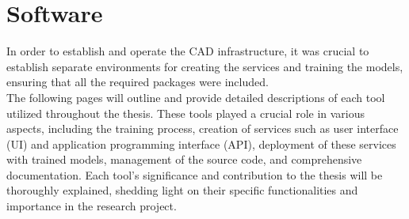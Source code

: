\section{Software}

In order to establish and operate the CAD infrastructure, it was crucial to
establish separate environments for creating the services and training the
models, ensuring that all the required packages were included. \\

The following pages will outline and provide detailed descriptions of each tool
utilized throughout the thesis. These tools played a crucial role in various
aspects, including the training process, creation of services such as user
interface (UI) and application programming interface (API), deployment of these
services with trained models, management of the source code, and comprehensive
documentation. Each tool's significance and contribution to the thesis will be
thoroughly explained, shedding light on their specific functionalities and
importance in the research project.

